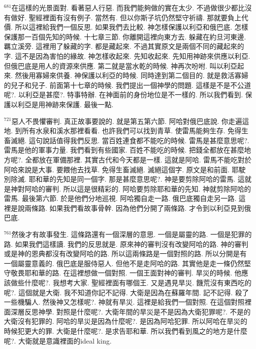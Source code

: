 \documentclass{book}
\begin{document}
$^{681}$在這樣的光景面對.
看著惡人行惡.
而我們能夠做的實在太少.
不過做很少都比沒有做好.
聖經裡面有沒有例子.
當然有.
但以你斯子坑仍然堅守祈禱.
那就要負上代價.
所以這裡給我們一個反思.
如果我們去比較.
神怎樣保護以利亞和俄巴底.
怎樣保護那一百個先知的時候.
十七章三節.
你離開這裡向東方去.
躲藏在約旦河東邊.
羈立溪旁.
這裡用了躲藏的字.
都是藏起來.
不過其實原文是兩個不同的藏起來的字.
這不是因為害怕的緣故.
神怎樣收起來.
先知收起來.
先知用神跡來供應以利亞.
但俄巴底是用人的資源來供應.
第二就是當水乾的時候.
神再次吩咐.
叫以利亞起來.
然後用寡婦來供養.
神保護以利亞的時候.
同時達到第二個目的.
就是救活寡婦的兒子和兒子.
前面第十七章的時候.
我們提出一個神學的問題.
這樣是不是不公道呢?.
以利亞是甚麼?.
特事特辦.
在神面前的身份地位是不一樣的.
所以我們看到.
保護以利亞是用神跡來保護.
最後一點.

$^{721}$惡人不畏懼審判.
真正故事要說的.
就是第五第六節.
阿哈對俄巴底說.
你走遍這地.
到所有水泉和溪水那裡看看.
也許我們可以找到青草.
使雷馬能夠生存.
免得生畜滅絕.
這句說話值得我們反思.
當百姓連食都不能吃的時候.
雷馬是甚麼意思呢?.
雷馬是他的軍事力量.
我們看到有些國家.
百姓不能吃的時候.
把錢全都放在甚麼地方呢?.
全都放在軍備那裡.
其實古代和今天都是一樣.
這就是阿哈.
雷馬不能吃對於阿哈來說是大事.
要餵他去找草.
免得生畜滅絕.
滅絕這個字.
原文是和前面.
耶駛別除滅.
耶和華的先知是同一個字.
那是甚麼意思呢?.
神是要剪除阿哈的雷馬.
這就是神對阿哈的審判.
所以這是很精彩的.
阿哈要剪除耶和華的先知.
神就剪除阿哈的雷馬.
最後第六節.
於是他們分地巡視.
阿哈獨自走一路.
俄巴底獨自走另一路.
這裡是說兩條路.
如果我們看故事骨幹.
因為他們分開了兩條路.
才令到以利亞見到俄巴底.

$^{761}$然後才有故事發生.
這條路還有一個深層的意思.
一個是屬靈的路.
一個是犯罪的路.
如果我們這樣讀.
我們的反思就是.
原來神的審判沒有改變阿哈的路.
神的審判或是神的恩典都沒有改變阿哈的路.
所以這兩條路是一個對照的路.
所以分開是有一個屬靈意義的.
俄巴底是服侍惡人.
但他不是走阿哈的路.
其實他是走一條仍然堅守敬畏耶和華的路.
在這裡想做一個對照.
一個王面對神的審判.
旱災的時候.
他應該做些什麼呢?.
我想考大家.
聖經裡面有哪個王.
又是遇見旱災.
饑荒沒有東西吃的呢?.
這個就是大衛.
我不知道你記不記得.
大衛是因為在蘇羅年間.
記不記得.
殺了一些機騙人.
然後神又怎樣呢?.
神就有旱災.
這裡是給我們一個對照.
在這個對照裡面深層反思神學.
對照是什麼呢?.
大衛年間的旱災是不是因為大衛犯罪呢?.
不是的 大衛沒有犯罪的.
阿哈的旱災是因為什麼呢?.
是因為阿哈犯罪.
所以阿哈在旱災的時候犯更大的罪.
大衛是什麼呢?.
是求告耶和華.
所以我們看到風之的地方是什麼呢?.
大衛就是意識裡面的ideal king.
\end{document}
